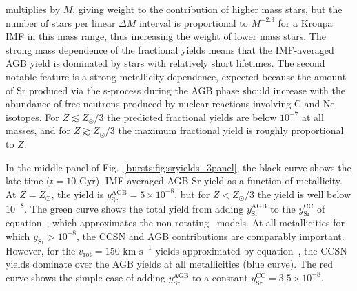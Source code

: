 multiplies by $M$, giving weight to the contribution of higher mass 
stars, but the number of stars per linear $\Delta M$ interval is proportional 
to $M^{-2.3}$ for a Kroupa IMF in this mass range, thus increasing the weight 
of lower mass stars. The strong mass dependence of the fractional yields means 
that the IMF-averaged AGB yield is dominated by stars with relatively short 
lifetimes. The second notable feature is a strong metallicity dependence, 
expected because the amount of Sr produced via the s-process during the AGB 
phase should increase with the abundance of free neutrons produced by nuclear 
reactions involving C and Ne isotopes. For $Z\lesssim Z_\odot/3$ the predicted 
fractional yields are below $10^{-7}$ at all masses, and for 
$Z\gtrsim Z_\odot/3$ the maximum fractional yield is roughly proportional to 
$Z$. 
\par 
In the middle panel of Fig.~\ref{bursts:fig:sryields_3panel}, the black curve shows 
the late-time ($t = 10$ Gyr), IMF-averaged AGB Sr yield as a function of 
metallicity. At $Z = Z_\odot$, the yield is $y_\text{Sr}^\text{AGB} = 
5\times10^{-8}$, but for $Z < Z_\odot/3$ the yield is well below $10^{-8}$. 
The green curve shows the total yield from adding $y_\text{Sr}^\text{AGB}$ to 
the $y_\text{Sr}^\text{CC}$ of equation~, which 
approximates the non-rotating~\citet{Limongi2018} models. At all metallicities 
for which $y_\text{Sr} > 10^{-8}$, the CCSN and AGB contributions are 
comparably important. However, for the $v_\text{rot} = 150\text{ km s}^{-1}$ 
yields approximated by equation~, the CCSN yields 
dominate over the AGB yields at all metallicities (blue curve). The red curve 
shows the simple case of adding $y_\text{Sr}^\text{AGB}$ to a constant 
$y_\text{Sr}^\text{CC} = 3.5\times10^{-8}$. 

